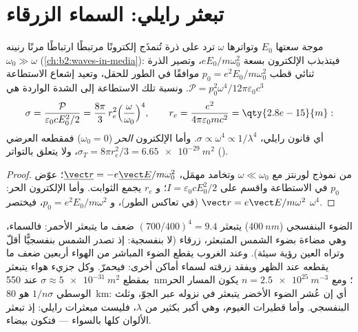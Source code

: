 \section{تبعثر رايلي: السماء الزرقاء}

\begin{proposition}\label{prop:b2:dipole-radiation:rayleigh}
موجة سعتها $E_0$ وتواترها $\omega$ ترد على ذرة تُنمذَج
إلكترونًا مرتبطًا ارتباطًا مرنًا رنينه $\omega_0 \gg \omega$
(\cref{ch:b2:waves-in-media}): فيتذبذب الإلكترون بسعة
$eE_0/m\omega_0^2$، وتصير الذرة ثنائي قطب $p_0 = e^2E_0/m\omega_0^2$ موافقًا في الطور
للحقل، وتعيد إشعاع الاستطاعة $\mathcal P = p_0^2\omega^4/12\pi
\varepsilon_0c^3$. ونسبة تلك الاستطاعة إلى الشدة الواردة هي
\emph{}
\[
\sigma = \frac{\mathcal P}{\varepsilon_0cE_0^2/2} = \frac{8\pi}3\,r_e^2\Bigl(\frac\omega{\omega_0}\Bigr)^4 ,
\qquad r_e = \frac{e^2}{4\pi\varepsilon_0mc^2} = \qty{2.8e-15}{m} :
\]
أي قانون رايلي، $\sigma \propto \omega^4 \propto 1/\lambda^4$. وأما الإلكترون \emph{الحر}
($\omega_0 = 0$) فمقطعه العرضي $\sigma_T = 8\pi r_e^2/3 =
\qty{6.65e-29}{m^2}$، ولا يتعلق بالتواتر ().
\end{proposition}

\begin{proof}
من نموذج لورنتز مع $\omega \ll \omega_0$ وتخامد مهمَل،
$\underline{\vect r} = -e\underline{\vect E}/m\omega_0^2$؛ عوّض $p_0$ في الاستطاعة
واقسم على $I = \varepsilon_0cE_0^2/2$؛ و $r_e$ يجمع الثوابت. وأما الإلكترون
الحر: $\vect r = e\vect E/m\omega^2$ (في تعاكس الطور)، و $p_0 = e^2E_0/m\omega^2$، فيختصر
$\omega^4$.
\end{proof}

\begin{example}\label{ex:b2:dipole-radiation:sky}
الضوء البنفسجي ($\qty{400}{nm}$) يتبعثر $(700/400)^4 = 9.4$ ضعف ما يتبعثر
الأحمر: فالسماء، وهي مضاءة بضوء الشمس المتبعثر، زرقاء (لا بنفسجية:
إذ تصدر الشمس بنفسجيًّا أقلّ وتراه العين رؤية سيئة). وعند الغروب يقطع
الضوء المباشر من الهواء أربعين ضعف ما يقطعه عند الظهر ويفقد زرقته
لسماء أماكن أخرى: فيحمرّ. وكل جزيء هواء يتبعثر بمقطع
$\sigma \approx \qty{5e-31}{m^2}$ عند \qty{550}{nm}؛ ومع $n = \qty{2.5e25}{m^{-3}}$ يكون
المسار الحر الوسطي $1/n\sigma$ هو \qty{80}{km}: أي إن عُشر الضوء الأخضر
يتبعثر في نزوله عبر الجوّ، وثلث
البنفسجي. وأما قطيرات الغيوم، وهي أكبر بكثير من $\lambda$، فليست
مبعثرات رايلي: إذ تبعثر الألوان كلها بالسواء --- فتكون بيضاء.
\end{example}


